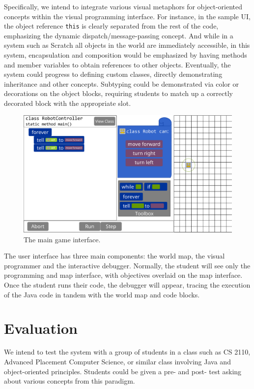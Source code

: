 \documentclass[12pt,notitlepage]{article}
\begin{document}
Specifically, we intend to integrate various visual metaphors for
object-oriented concepts within the visual programming interface. For
instance, in the sample UI, the object reference \texttt{this} is
clearly separated from the rest of the code, emphasizing the dynamic
dispatch/message-passing concept. And while in a system such as
Scratch all objects in the world are immediately accessible, in this
system, encapsulation and composition would be emphasized by having
methods and member variables to obtain references to other
objects. Eventually, the system could progress to defining custom
classes, directly demonstrating inheritance and other
concepts. Subtyping could be demonstrated via color or decorations on
the object blocks, requiring students to match up a correctly
decorated block with the appropriate slot.

\begin{figure}[h]
  \centering
  \includegraphics[width=\textwidth]{mockup.pdf}
  \caption{The main game interface.}
\end{figure}
The user interface has three main components: the world map, the
visual programmer and the interactive debugger. Normally, the student
will see only the programming and map interface, with objectives
overlaid on the map interface. Once the student runs their code, the
debugger will appear, tracing the execution of the Java code in tandem
with the world map and code blocks.

\section{Evaluation}

We intend to test the system with a group of students in a class such
as CS 2110, Advanced Placement Computer Science, or similar class
involving Java and object-oriented principles. Students could be given
a pre- and post- test asking about various concepts from this paradigm.
\end{document}
